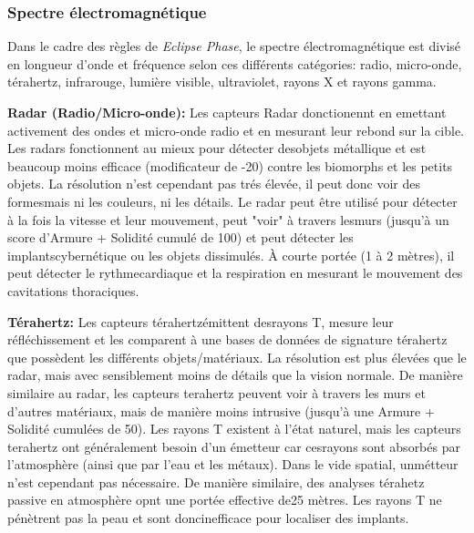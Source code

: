 {{\subsubsection{Spectre électromagnétique} 

Dans le cadre des règles de \textit{Eclipse Phase}, le spectre électromagnétique est divisé en longueur d'onde et fréquence selon ces différents catégories: radio, micro-onde, térahertz, infrarouge, lumière visible, ultraviolet, rayons X et rayons gamma. 

\textbf{Radar (Radio/Micro-onde): }Les capteurs Radar donctionennt en emettant activement des ondes et micro-onde radio et en mesurant leur rebond sur la cible. Les radars fonctionnent au mieux pour détecter desobjets métallique et est beaucoup moins efficace (modificateur de -20) contre les biomorphs et les petits objets. La résolution n'est cependant pas trés élevée, il peut donc voir des formesmais ni les couleurs, ni les détails. Le radar peut être utilisé pour détecter à la fois la vitesse et leur mouvement, peut "voir" à travers lesmurs (jusqu'à un score d'Armure + Solidité cumulé de 100) et peut détecter les implantscybernétique ou les objets dissimulés. À courte portée (1 à 2 mètres), il peut détecter le rythmecardiaque et la respiration en mesurant le mouvement des cavitations thoraciques. 

\textbf{Térahertz:} Les capteurs térahertzémittent desrayons T, mesure leur réfléchissement et les comparent à une bases de données de signature térahertz que possèdent les différents objets/matériaux. La résolution est plus élevées que le radar, mais avec sensiblement moins de détails que la vision normale. De manière similaire au radar, les capteurs terahertz peuvent voir à travers les murs et d'autres matériaux, mais de manière moins intrusive (jusqu'à une Armure + Solidité cumulées de 50). Les rayons T existent à l'état naturel, mais les capteurs terahertz ont généralement besoin d'un émetteur car cesrayons sont absorbés par l'atmosphère (ainsi que par l'eau et les métaux). Dans le vide spatial, unmétteur n'est cependant pas nécessaire. De manière similaire, des analyses térahetz passive en atmosphère opnt une portée effective de25 mètres. Les rayons T ne pénètrent pas la peau et sont doncinefficace pour localiser des implants. 

}}

